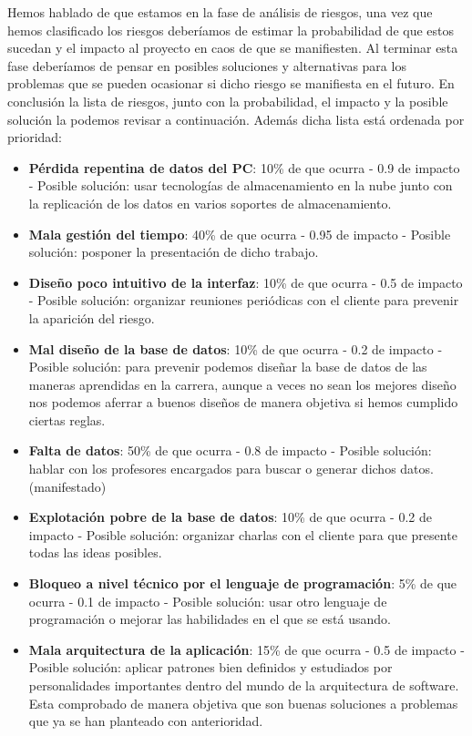 Hemos hablado de que estamos en la fase de análisis de riesgos, una vez que hemos clasificado los riesgos deberíamos de estimar la probabilidad de que estos sucedan y el impacto al proyecto en caos de que se manifiesten. Al terminar esta fase deberíamos de pensar en posibles soluciones y alternativas para los problemas que se pueden ocasionar si dicho riesgo se manifiesta en el futuro. En conclusión la lista de riesgos, junto con la probabilidad, el impacto y la posible solución la podemos revisar a continuación. Además dicha lista está ordenada por prioridad:

\begin{itemize}
\item \textbf{Pérdida repentina de datos del PC}: 10\% de que ocurra - 0.9 de impacto - Posible solución: usar tecnologías de almacenamiento en la nube junto con la replicación de los datos en varios soportes de almacenamiento. 
\item \textbf{Mala gestión del tiempo}: 40\% de que ocurra - 0.95 de impacto - Posible solución: posponer la presentación de dicho trabajo.
\item \textbf{Diseño poco intuitivo de la interfaz}: 10\% de que ocurra - 0.5 de impacto - Posible solución: organizar reuniones periódicas con el cliente para prevenir la aparición del riesgo.
\item \textbf{Mal diseño de la base de datos}: 10\% de que ocurra - 0.2 de impacto - Posible solución: para prevenir podemos diseñar la base de datos de las maneras aprendidas en la carrera, aunque a veces no sean los mejores diseño nos podemos aferrar a buenos diseños de manera objetiva si hemos cumplido ciertas reglas. 
\item \textbf{Falta de datos}: 50\% de que ocurra - 0.8 de impacto - Posible solución: hablar con los profesores encargados para buscar o generar dichos datos. (manifestado)
\item \textbf{Explotación pobre de la base de datos}: 10\% de que ocurra - 0.2 de impacto - Posible solución: organizar charlas con el cliente para que presente todas las ideas posibles. 
\item \textbf{Bloqueo a nivel técnico por el lenguaje de programación}: 5\% de que ocurra - 0.1 de impacto - Posible solución: usar otro lenguaje de programación o mejorar las habilidades en el que se está usando.
\item \textbf{Mala arquitectura de la aplicación}: 15\% de que ocurra - 0.5 de impacto - Posible solución: aplicar patrones bien definidos y estudiados por personalidades importantes dentro del mundo de la arquitectura de software. Esta comprobado de manera objetiva que son buenas soluciones a problemas que ya se han planteado con anterioridad. 

\end{itemize}
